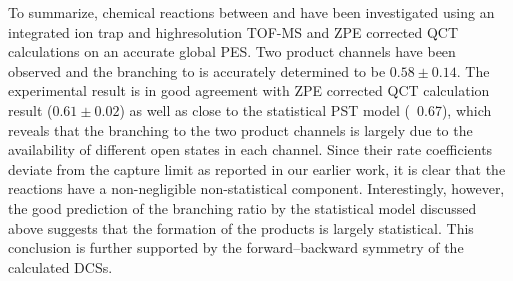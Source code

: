 To summarize, chemical reactions between  and  have been investigated using an integrated ion trap and highresolution TOF-MS and ZPE corrected QCT calculations on an accurate global PES. Two product channels have been observed and the branching to  is accurately determined to be $0.58 \pm 0.14$. The experimental result is in good agreement with ZPE corrected QCT calculation result ($0.61 \pm 0.02$) as well as close to the statistical PST model (~0.67), which reveals that the branching to the two product channels is largely due to the availability of different open states in each channel. Since their rate coefficients deviate from the capture limit as reported in our earlier work, it is clear that the  reactions have a non-negligible non-statistical component. Interestingly, however, the good prediction of the branching ratio by the statistical model discussed above suggests that the formation of the products is largely statistical. This conclusion is further supported by the forward–backward symmetry of the calculated DCSs.

